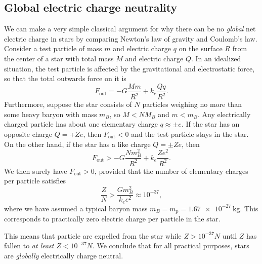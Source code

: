 \subsection{Global electric charge neutrality}

We can make a very simple classical argument for why there can be no \emph{global} net electric charge in stars by comparing Newton's law of gravity and Coulomb's law.
Consider a test particle of mass $m$ and electric charge $q$ on the surface $R$ from the center of a star with total mass $M$ and electric charge $Q$.
In an idealized situation, the test particle is affected by the gravitational and electrostatic force, so that the total outwards  force on it is
\begin{equation}
	F_\text{out} = -G \frac{M m}{R^2} + k_e \frac{Q q}{R^2} .
\end{equation}
Furthermore, suppose the star consists of $N$ particles weighing  no more than some heavy baryon with mass $m_B$, so $M < N M_B$ and $m < m_B$.
Any electrically charged particle has about one elementary charge $q \approx \pm e$.
If the star has an opposite charge $Q = \mp Z e$, then $F_\text{out} < 0$ and the test particle stays in the star.
On the other hand, if the star has a like charge $Q = \pm Z e$, then
\begin{equation}
	F_\text{out} > -G \frac{N m_B^2}{R^2} + k_e \frac{Z e^2}{R^2} .
\end{equation}
We then surely have $F_\text{out} > 0$, provided that the number of elementary charges per particle satisfies
\begin{equation}
	\frac{Z}{N} > \frac{G m_B^2}{k_e e^2} \approx 10^{-37} ,
\end{equation}
where we have assumed a typical baryon mass $m_B = m_p = \SI{1.67e-27}{\kilogram}$.
This corresponds to practically zero electric charge per particle in the star.

This means that particle are expelled from the star while $Z > 10^{-37} N$ until $Z$ has fallen to \emph{at least} $Z < 10^{-37} N$.
We conclude that for all practical purposes, stars are \emph{globally} electrically charge neutral.




